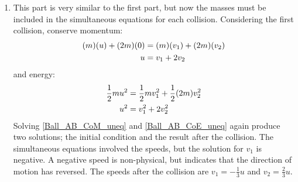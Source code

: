 \begin{problem}[A1969AMIIQ8l]
{\begin{enumerate}
Repeating this process exactly but for the second collision, Figure \ref{fig:Dynamics_ball_collision_BC}, and leaving $v_{2}$ unsubstituted, gives simultaneous equations:
\begin{align} 
v_{2} &= w_{2} + w_{3} \label{Ball_BC_CoM} \\  
v_{2}^{2} &= w_{2}^{2} + w_{3}^{2} \label{Ball_BC_CoE}
\end{align}
where again \ref{Ball_BC_CoM} comes from conserving momentum and \ref{Ball_BC_CoE} comes from conserving energy. Solving these gives $w_{2} = 0$ and $w_{3} = v_{2} = u$, with the same reasoning as before applying.

We now have the three velocities:
\begin{align*}
 v_{1} = 0 && w_{2} = 0 && w_{3} = u 
\end{align*}
as the final velocities of the three balls.


	\item This part is very similar to the first part, but now the masses must be included in the simultaneous equations for each collision. Considering the first collision, conserve momentum:
\begin{align} \notag 
(m)(u) + (2m)(0) &= (m)(v_{1}) + (2m)(v_{2}) \\ 
u &= v_{1} + 2v_{2} \label{Ball_AB_CoM_uneq} 
\end{align}
and energy:
\begin{align} \notag 
\frac{1}{2}mu^{2} &= \frac{1}{2}mv_{1}^{2} + \frac{1}{2}(2m)v_{2}^{2} \\ 
u^{2} &= v_{1}^{2} + 2v_{2}^{2} \label{Ball_AB_CoE_uneq} 
\end{align}
Solving \ref{Ball_AB_CoM_uneq} and \ref{Ball_AB_CoE_uneq} again produce two solutions; the initial condition and the result after the collision. The simultaneous equations involved the speeds, but the solution for $v_{1}$ is negative. A negative speed is non-physical, but indicates that the direction of motion has reversed. The speeds after the collision are $v_{1} = - \frac{1}{3}u$ and $v_{2} = \frac{2}{3}u$.


\end{enumerate}}
\end{problem}
